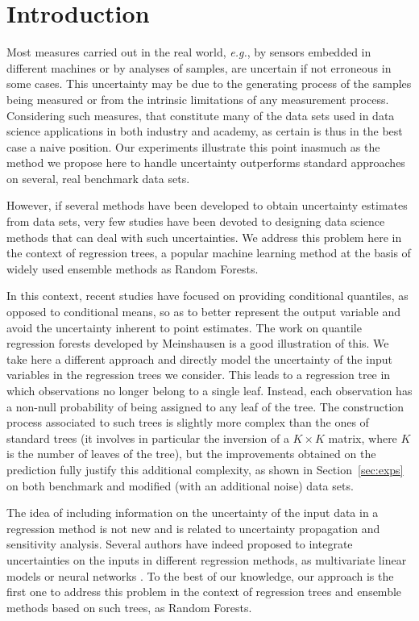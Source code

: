 \section{Introduction}

Most measures carried out in the real world, \textit{e.g.}, by sensors embedded in different machines or by analyses of samples, are uncertain if not erroneous in some cases. This uncertainty may be due to the generating process of the samples being measured or from the intrinsic limitations of any measurement process. Considering such measures, that constitute many of the data sets used in data science applications in both industry and academy, as certain is thus in the best case a naive position. Our experiments illustrate this point inasmuch as the method we propose here to handle uncertainty outperforms standard approaches on several, real benchmark data sets.

However, if several methods have been developed to obtain uncertainty estimates from data sets, very few studies have been devoted to designing data science methods that can deal with such uncertainties. We address this problem here in the context of regression trees, a popular machine learning method at the basis of widely used ensemble methods as Random Forests.

In this context, recent studies have focused on providing conditional quantiles, as opposed to conditional means, so as to better represent the output variable and avoid the uncertainty inherent to point estimates. The work on quantile regression forests developed by Meinshausen \cite{meinshausen2006quantile} is a good illustration of this. We take here a different approach and directly model the uncertainty of the input variables in the regression trees we consider. This leads to a regression tree in which observations no longer belong to a single leaf. Instead, each observation has a non-null probability of being assigned to any leaf of the tree. The construction process associated to such trees is slightly more complex than the ones of standard trees (it involves in particular the inversion of a $K \times K$ matrix, where $K$ is the number of leaves of the tree), but the improvements obtained on the prediction fully justify this additional complexity, as shown in Section~\ref{sec:exps} on both benchmark and modified (with an additional noise) data sets.

The idea of including information on the uncertainty of the input data in a regression method is not new and is related to uncertainty propagation and sensitivity analysis. Several authors have indeed proposed to integrate uncertainties on the inputs in different regression methods, as multivariate linear models \cite{reis2005} or neural networks \cite{gal2016}. To the best of our knowledge, our approach is the first one to address this problem in the context of regression trees and ensemble methods based on such trees, as Random Forests.

